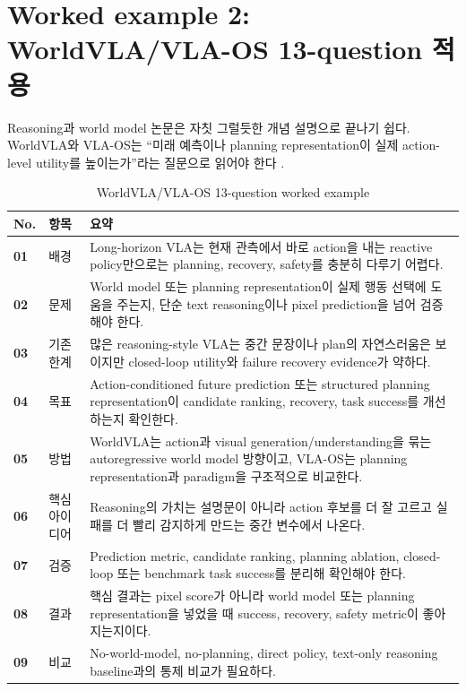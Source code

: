 \section{Worked example 2: WorldVLA/VLA-OS 13-question 적용}

Reasoning과 world model 논문은 자칫 그럴듯한 개념 설명으로 끝나기 쉽다. WorldVLA와 VLA-OS는 ``미래 예측이나 planning representation이 실제 action-level utility를 높이는가''라는 질문으로 읽어야 한다 \citep{worldvla,vlaos}.

\begin{table}[t]
  \centering
  \small
  \caption{WorldVLA/VLA-OS 13-question worked example}
  \label{tab:worldvla_vlaos_worked_example}
  \begin{tabularx}{\textwidth}{>{\bfseries}p{8mm}p{24mm}X}
    \toprule
    No. & 항목 & 요약 \\
    \midrule
    01 & 배경 & Long-horizon VLA는 현재 관측에서 바로 action을 내는 reactive policy만으로는 planning, recovery, safety를 충분히 다루기 어렵다. \\
    02 & 문제 & World model 또는 planning representation이 실제 행동 선택에 도움을 주는지, 단순 text reasoning이나 pixel prediction을 넘어 검증해야 한다. \\
    03 & 기존 한계 & 많은 reasoning-style VLA는 중간 문장이나 plan의 자연스러움은 보이지만 closed-loop utility와 failure recovery evidence가 약하다. \\
    04 & 목표 & Action-conditioned future prediction 또는 structured planning representation이 candidate ranking, recovery, task success를 개선하는지 확인한다. \\
    05 & 방법 & WorldVLA는 action과 visual generation/understanding을 묶는 autoregressive world model 방향이고, VLA-OS는 planning representation과 paradigm을 구조적으로 비교한다. \\
    06 & 핵심 아이디어 & Reasoning의 가치는 설명문이 아니라 action 후보를 더 잘 고르고 실패를 더 빨리 감지하게 만드는 중간 변수에서 나온다. \\
    07 & 검증 & Prediction metric, candidate ranking, planning ablation, closed-loop 또는 benchmark task success를 분리해 확인해야 한다. \\
    08 & 결과 & 핵심 결과는 pixel score가 아니라 world model 또는 planning representation을 넣었을 때 success, recovery, safety metric이 좋아지는지이다. \\
    09 & 비교 & No-world-model, no-planning, direct policy, text-only reasoning baseline과의 통제 비교가 필요하다. \\

\end{tabularx}
\end{table}
